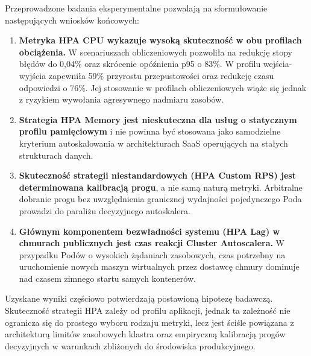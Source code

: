 Przeprowadzone badania eksperymentalne pozwalają na sformułowanie następujących wniosków końcowych:
\begin{enumerate}
  \item \textbf{Metryka HPA CPU wykazuje wysoką skuteczność w obu profilach obciążenia.} W scenariuszach obliczeniowych pozwoliła na redukcję stopy błędów do 0,04\% oraz skrócenie opóźnienia p95 o 83\%. W profilu wejścia-wyjścia zapewniła 59\% przyrostu przepustowości oraz redukcję czasu odpowiedzi o 76\%. Jej stosowanie w profilach obliczeniowych wiąże się jednak z ryzykiem wywołania agresywnego nadmiaru zasobów.
  \item \textbf{Strategia HPA Memory jest nieskuteczna dla usług o statycznym profilu pamięciowym} i nie powinna być stosowana jako samodzielne kryterium autoskalowania w architekturach SaaS operujących na stałych strukturach danych.
  \item \textbf{Skuteczność strategii niestandardowych (HPA Custom RPS) jest determinowana kalibracją progu}, a nie samą naturą metryki. Arbitralne dobranie progu bez uwzględnienia granicznej wydajności pojedynczego Poda prowadzi do paraliżu decyzyjnego autoskalera.
  \item \textbf{Głównym komponentem bezwładności systemu (HPA Lag) w chmurach publicznych jest czas reakcji Cluster Autoscalera.} W przypadku Podów o wysokich żądaniach zasobowych, czas potrzebny na uruchomienie nowych maszyn wirtualnych przez dostawcę chmury dominuje nad czasem zimnego startu samych kontenerów.
\end{enumerate}

Uzyskane wyniki częściowo potwierdzają postawioną hipotezę badawczą. Skuteczność strategii HPA zależy od profilu aplikacji, jednak ta zależność nie ogranicza się do prostego wyboru rodzaju metryki, lecz jest ściśle powiązana z architekturą limitów zasobowych klastra oraz empiryczną kalibracją progów decyzyjnych w warunkach zbliżonych do środowiska produkcyjnego.
